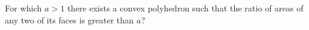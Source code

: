 \problem
For which $a > 1$ there exists a convex polyhedron such that the ratio of
areas of any two of its faces is greater than $a$?
\solution
\endproblem
